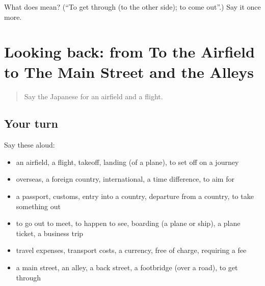 \begin{tcolorbox}[breakable,colback=teal!4,colframe=teal!35!black,title={Before you move on}]
What does  mean? (\textquotedblleft{}To get through (to the other side); to come out\textquotedblright{}.) Say it once more.
\end{tcolorbox}
\section[(dialogue)]{Looking back: from To the Airfield to The Main Street and the Alleys}

\label{lesson:JA-R389-review-384-389}



\begin{quote}
Say the Japanese for an airfield and a flight.
\end{quote}

\subsection*{Your turn}
Say these aloud:

\begin{itemize}
\raggedright
  \item an airfield, a flight, takeoff, landing (of a plane), to set off on a journey
  \item overseas, a foreign country, international, a time difference, to aim for
  \item a passport, customs, entry into a country, departure from a country, to take something out
  \item to go out to meet, to happen to see, boarding (a plane or ship), a plane ticket, a business trip
  \item travel expenses, transport costs, a currency, free of charge, requiring a fee
  \item a main street, an alley, a back street, a footbridge (over a road), to get through
\end{itemize}

